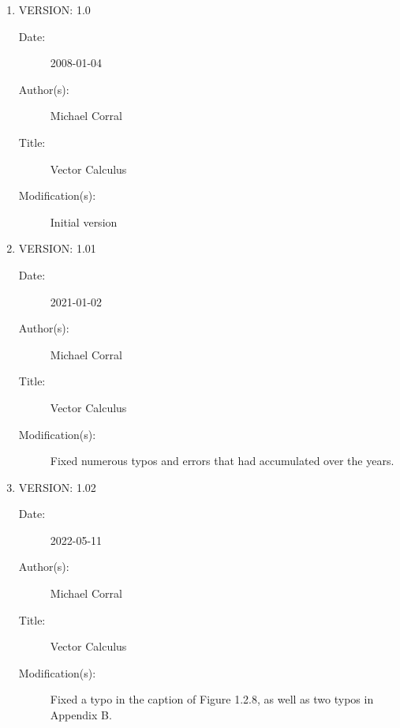 \documentclass[letterpaper,11pt,titlepage,openany,twoside,numbers=noenddot,bibliography=totoc,index=totoc]{scrbook}
\theoremstyle{definition}
\theoremstyle{itexmp}
\newcommand\myclearpage{\cleartooddpage
 [\thispagestyle{empty}]}
\numberwithin{figure}{section}
\begin{document}
\begin{enumerate}

\item VERSION: 1.0
\begin{description}
\item[Date:] 2008-01-04
\item[Author(s):] Michael Corral
\item[Title:] Vector Calculus
\item[Modification(s):] Initial version
\end{description}

\item VERSION: 1.01
\begin{description}
\item[Date:] 2021-01-02
\item[Author(s):] Michael Corral
\item[Title:] Vector Calculus
\item[Modification(s):] Fixed numerous typos and errors that had accumulated over the years.
\end{description}

\item VERSION: 1.02
\begin{description}
\item[Date:] 2022-05-11
\item[Author(s):] Michael Corral
\item[Title:] Vector Calculus
\item[Modification(s):] Fixed a typo in the caption of Figure 1.2.8, as well as two typos in Appendix B.
\end{description}

\end{enumerate}

\backmatter
\clearpage
{}
\printindex

\myclearpage
\end{document}
